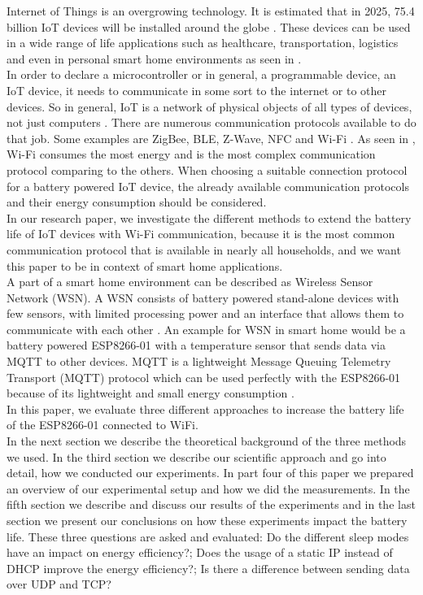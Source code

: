 Internet of Things is an overgrowing technology. It is estimated that in 2025, 75.4 billion IoT devices will be installed around the globe \cite{lucero2016iot}. These devices can be used in a wide range of life applications such as healthcare, transportation, logistics and even in personal smart home environments as seen in \cite{6803174}.\\  
In order to declare a microcontroller or in general, a programmable device, an IoT device, it needs to communicate in some sort to the internet or to other devices. So in general, IoT is a network of physical objects of all types of devices, not just computers \cite{patel2016internet}. There are numerous communication protocols available to do that job. Some examples are ZigBee, BLE, Z-Wave, NFC and Wi-Fi \cite{8079928}. As seen in \cite{8088226}, Wi-Fi consumes the most energy and is the most complex communication protocol comparing to the others.  
When choosing a suitable connection protocol for a battery powered IoT device, the already available communication protocols and their energy consumption should be considered.\\
In our research paper, we investigate the different methods to extend the battery life of IoT devices with Wi-Fi communication, because it is the most common communication protocol that is available in nearly all households, and we want this paper to be in context of smart home applications.\\
A part of a smart home environment can be described as Wireless Sensor Network (WSN). A WSN consists of battery powered stand-alone devices with few sensors, with limited processing power and an interface that allows them to communicate with each other \cite{wsn}. 
An example for WSN in smart home would be a battery powered ESP8266-01 with a temperature sensor that sends data via MQTT to other devices.
MQTT is a lightweight Message Queuing Telemetry Transport (MQTT) protocol which can be used perfectly with the ESP8266-01 because of its lightweight and small energy consumption \cite{kodali_mqtt_2016}.\\
In this paper, we evaluate three different approaches to increase the battery life of the ESP8266-01 connected to WiFi.\\
In the next section we describe the theoretical background of the three methods we used. 
In the third section we describe our scientific approach and go into detail, how we conducted our experiments.
In part four of this paper we prepared an overview of our experimental setup and how we did the measurements.
In the fifth section we describe and discuss our results of the experiments and in the last section we present our conclusions on how these experiments impact the battery life.
These three questions are asked and evaluated: Do the different sleep modes have an impact on energy efficiency?; Does the usage of a static IP instead of DHCP improve the energy efficiency?; Is there a difference between sending data over UDP and TCP?
